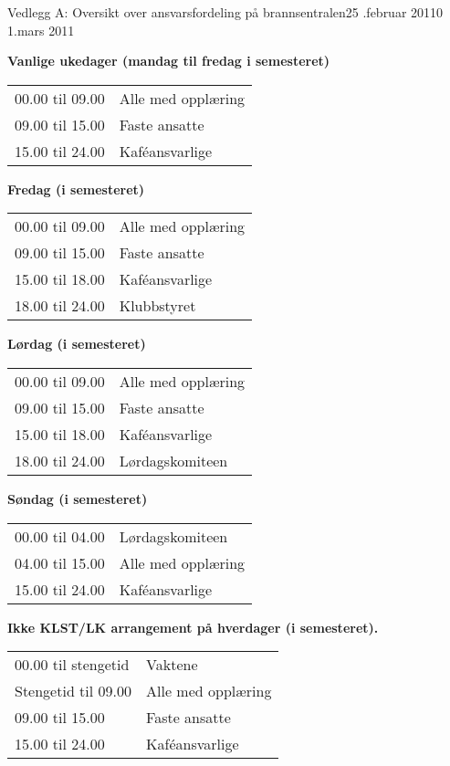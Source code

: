\begin{instruks}{Vedlegg A: Oversikt over ansvarsfordeling på brannsentralen}{25 .februar 2011}{0 1.mars 2011}
    
    
    \textbf{Vanlige ukedager (mandag til fredag i semesteret)}

    \begin{tabular}{ll}
        00.00 til 09.00 &    Alle med opplæring \\
        09.00 til 15.00 &    Faste ansatte\\
        15.00 til 24.00 &    Kaf\'eansvarlige 
    \end{tabular}

    
    \textbf{Fredag (i semesteret)}
    
    \begin{tabular}{ll}
        00.00 til 09.00 &Alle med opplæring \\
        09.00 til 15.00 &Faste ansatte\\
        15.00 til 18.00 &Kaf\'eansvarlige\\
        18.00 til 24.00 &Klubbstyret
    \end{tabular}

    
    \textbf{Lørdag (i semesteret)}
    
    
    \begin{tabular}{ll}
        00.00 til 09.00 &Alle med opplæring \\
        09.00 til 15.00 &Faste ansatte\\
        15.00 til 18.00 &Kaf\'eansvarlige\\
        18.00 til 24.00 & Lørdagskomiteen
    \end{tabular}

    
    \textbf{Søndag (i semesteret)}
    
    
    \begin{tabular}{ll}
        00.00 til 04.00 &Lørdagskomiteen\\
        04.00 til 15.00 & Alle med opplæring\\
        15.00 til 24.00 & Kaf\'eansvarlige
    \end{tabular}

    
    \textbf{Ikke KLST/LK arrangement på hverdager (i semesteret).}
    
    
    \begin{tabular}{ll}
        00.00 til stengetid &    Vaktene\\
        Stengetid til 09.00 &    Alle med opplæring\\
        09.00 til 15.00 &     Faste ansatte \\
        15.00 til 24.00 &    Kaf\'eansvarlige 
    \end{tabular}


\end{instruks}
